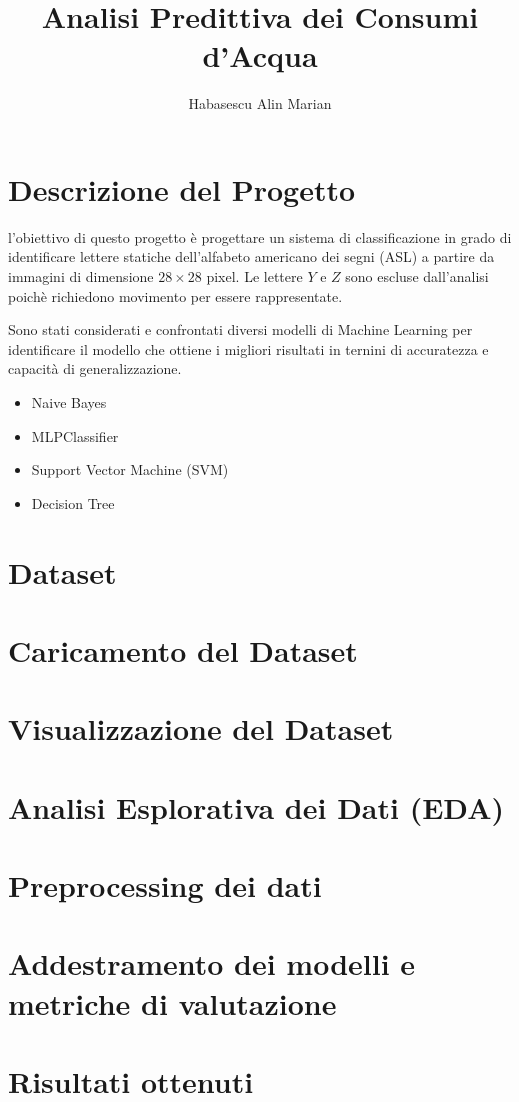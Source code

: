 \documentclass{article}
\title{Analisi Predittiva dei Consumi d'Acqua}
\author{Habasescu Alin Marian}
\begin{document}
\maketitle

\tableofcontents
\clearpage

\section{Descrizione del Progetto}

l'obiettivo di questo progetto è progettare un sistema di classificazione in 
grado di identificare lettere statiche dell'alfabeto americano dei segni (ASL) a partire da immagini 
di dimensione \(28\times28\) pixel. Le lettere \(Y\) e \(Z\) sono escluse dall'analisi poichè 
richiedono movimento per essere rappresentate. 

Sono stati considerati e confrontati diversi modelli di Machine Learning per identificare il 
modello che ottiene i migliori risultati in ternini di accuratezza e capacità di generalizzazione. 

\begin{itemize}
    \item Naive Bayes
    \item MLPClassifier
    \item Support Vector Machine (SVM)    
    \item Decision Tree
\end{itemize}

\section{Dataset}
\section{Caricamento del Dataset}
\section{Visualizzazione del Dataset}
\section{Analisi Esplorativa dei Dati (EDA)}
\section{Preprocessing dei dati}
\section{Addestramento dei modelli e metriche di valutazione}
\section{Risultati ottenuti}
\end{document}
